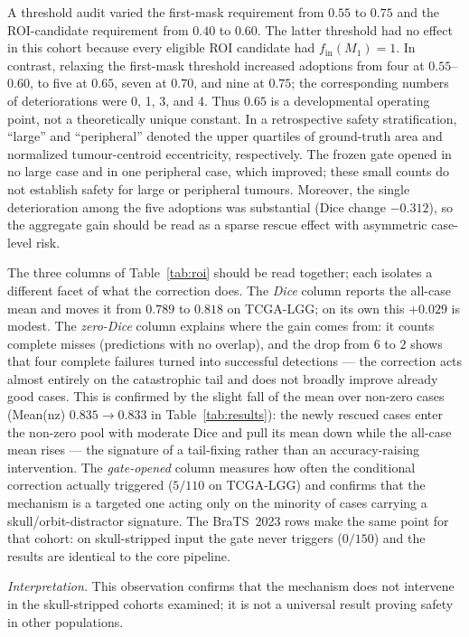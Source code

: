 \documentclass[11pt,a4paper]{article}
\begin{document}
A threshold audit varied the first-mask requirement from $0.55$ to $0.75$ and the
ROI-candidate requirement from $0.40$ to $0.60$. The latter threshold had no
effect in this cohort because every eligible ROI candidate had
$f_{\mathrm{in}}(M_1)=1$. In contrast, relaxing the first-mask threshold increased
adoptions from four at $0.55$--$0.60$, to five at $0.65$, seven at $0.70$, and
nine at $0.75$; the corresponding numbers of deteriorations were 0, 1, 3, and 4.
Thus $0.65$ is a developmental operating point, not a theoretically unique
constant. In a retrospective safety stratification, ``large'' and ``peripheral''
denoted the upper quartiles of ground-truth area and normalized tumour-centroid
eccentricity, respectively. The frozen gate opened in no large case and in one
peripheral case, which improved; these small counts do not establish safety for
large or peripheral tumours. Moreover, the single deterioration among the five
adoptions was substantial (Dice change $-0.312$), so the aggregate gain should be
read as a sparse rescue effect with asymmetric case-level risk.

The three columns of Table~\ref{tab:roi} should be read together; each isolates a
different facet of what the correction does. The \emph{Dice} column reports the
all-case mean and moves it from $0.789$ to $0.818$ on TCGA-LGG; on its own this
$+0.029$ is modest. The \emph{zero-Dice} column explains where the gain comes
from: it counts complete misses (predictions with no overlap), and the drop from
$6$ to $2$ shows that four complete failures turned into successful detections
--- the correction acts almost entirely on the catastrophic tail and does not
broadly improve already good cases. This is confirmed by the slight fall of the
mean over non-zero cases (Mean(nz) $0.835\to0.833$ in
Table~\ref{tab:results}): the newly rescued cases enter the non-zero pool with
moderate Dice and pull its mean down while the all-case mean rises --- the
signature of a tail-fixing rather than an accuracy-raising intervention. The
\emph{gate-opened} column measures how often the conditional correction actually
triggered ($5/110$ on TCGA-LGG) and confirms that the mechanism is a targeted one
acting only on the minority of cases carrying a skull/orbit-distractor signature.
The BraTS~2023 rows make the same point for that cohort: on skull-stripped input
the gate never triggers ($0/150$) and the results are identical to the core
pipeline.

\emph{Interpretation.} This observation confirms that the mechanism does not
intervene in the skull-stripped cohorts examined; it is not a universal result
proving safety in other populations.
\end{document}
